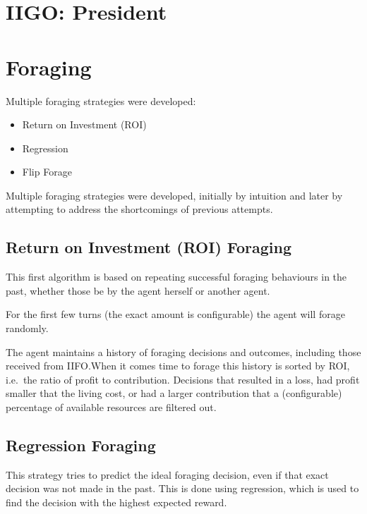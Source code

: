 \section{IIGO: President}

\section{Foraging}
Multiple foraging strategies were developed: 
\begin{itemize}
    \item Return on Investment (ROI)
    \item Regression
    \item Flip Forage
\end{itemize}

Multiple foraging strategies were developed, initially by intuition and later by attempting to address the shortcomings of previous attempts.

\subsection{Return on Investment (ROI) Foraging}%
\label{sec:forage-roi}

This first algorithm is based on repeating successful foraging behaviours in the past, whether those be by the agent herself or another agent.

For the first few turns (the exact amount is configurable) the agent will forage randomly.

The agent maintains a history of foraging decisions and outcomes, including those received from IIFO.\@ When it comes time to forage this history is sorted by ROI, i.e.\ the ratio of profit to contribution. Decisions that resulted in a loss, had profit smaller that the living cost, or had a larger contribution that a (configurable) percentage of available resources are filtered out.

\subsection{Regression Foraging}%
\label{sec:forage-regression}

This strategy tries to predict the ideal foraging decision, even if that exact decision was not made in the past. This is done using regression, which is used to find the decision with the highest expected reward.


